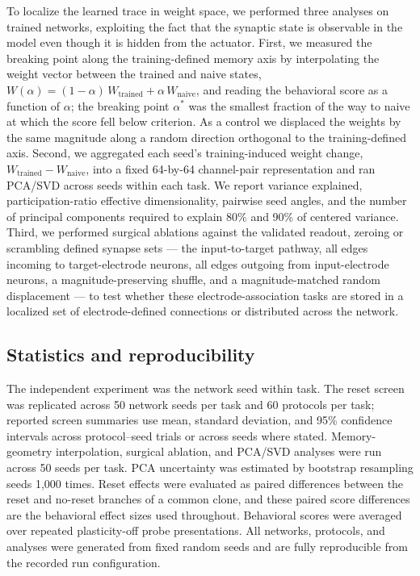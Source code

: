 \documentclass{article}
\begin{document}
To localize the learned trace in weight space, we performed three analyses on trained networks, exploiting the fact that the synaptic state is observable in the model even though it is hidden from the actuator. First, we measured the breaking point along the training-defined memory axis by interpolating the weight vector between the trained and naive states, $W(\alpha) = (1 - \alpha)\,W_{\mathrm{trained}} + \alpha\,W_{\mathrm{naive}}$, and reading the behavioral score as a function of $\alpha$; the breaking point $\alpha^{*}$ was the smallest fraction of the way to naive at which the score fell below criterion. As a control we displaced the weights by the same magnitude along a random direction orthogonal to the training-defined axis. Second, we aggregated each seed's training-induced weight change, $W_{\mathrm{trained}} - W_{\mathrm{naive}}$, into a fixed 64-by-64 channel-pair representation and ran PCA/SVD across seeds within each task. We report variance explained, participation-ratio effective dimensionality, pairwise seed angles, and the number of principal components required to explain 80\% and 90\% of centered variance. Third, we performed surgical ablations against the validated readout, zeroing or scrambling defined synapse sets --- the input-to-target pathway, all edges incoming to target-electrode neurons, all edges outgoing from input-electrode neurons, a magnitude-preserving shuffle, and a magnitude-matched random displacement --- to test whether these electrode-association tasks are stored in a localized set of electrode-defined connections or distributed across the network.

\subsection*{Statistics and reproducibility}

The independent experiment was the network seed within task. The reset screen was replicated across 50 network seeds per task and 60 protocols per task; reported screen summaries use mean, standard deviation, and 95\% confidence intervals across protocol--seed trials or across seeds where stated. Memory-geometry interpolation, surgical ablation, and PCA/SVD analyses were run across 50 seeds per task. PCA uncertainty was estimated by bootstrap resampling seeds 1,000 times. Reset effects were evaluated as paired differences between the reset and no-reset branches of a common clone, and these paired score differences are the behavioral effect sizes used throughout. Behavioral scores were averaged over repeated plasticity-off probe presentations. All networks, protocols, and analyses were generated from fixed random seeds and are fully reproducible from the recorded run configuration.
\end{document}
